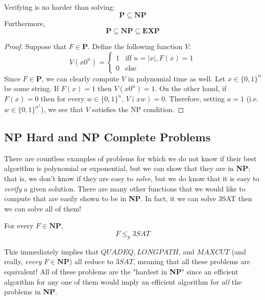   \begin{theorem}
  Verifying is no harder than solving: 
  \[\mathbf{P} \subseteq \mathbf{NP}\]
  Furthermore, 
  \[\mathbf{P} \subseteq \mathbf{NP} \subseteq \mathbf{EXP}\]
  \begin{center}
  \end{center}
  \end{theorem}
  \begin{proof}
  Suppose that $F \in \mathbf{P}$. Define the following function $V$:
  \[V (x 0^n) = \begin{cases}
  1 & \text{iff } n = |x|, F(x) = 1 \\
  0 & \text{else} 
  \end{cases}\]
  Since $F \in \mathbf{P}$, we can clearly compute $V$ in polynomial time as well. Let $x \in \{0,1\}^n$ be some string. If $F(x) = 1$ then $V(x 0^n) = 1$. On the other hand, if $F(x) = 0$ then for every $w \in \{0,1\}^n$, $V(xw) = 0$. Therefore, setting $a = 1$ (i.e. $w \in \{0,1\}^{n^1}$), we see that $V$ satisfies the NP condition. 
  \end{proof}

\subsection{NP Hard and NP Complete Problems}

  There are countless examples of problems for which we do not know if their best algorithm is polynomial or exponential, but we can show that they are in \textbf{NP}; that is, we don't know if they are easy to \textit{solve}, but we do know that it is easy to \textit{verify} a given solution. There are many other functions that we would like to compute that are easily shown to be in \textbf{NP}. In fact, it we can solve 3SAT then we can solve all of them! 

  \begin{theorem}
  For every $F \in \mathbf{NP}$, 
  \[F \leq_p 3SAT\]
  \end{theorem}
  This immediately implies that $QUADEQ, LONGPATH$, and $MAXCUT$ (and really, \textit{every} $F \in \mathbf{NP}$) all reduce to $3SAT$, meaning that all these problems are equivalent! All of these problems are the "hardest in \textbf{NP}" since an efficient algorithm for any one of them would imply an efficient algorithm for \textit{all} the problems in \textbf{NP}. 

